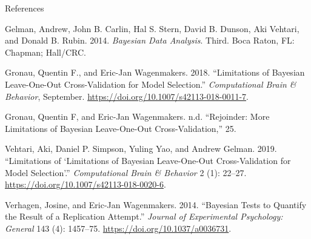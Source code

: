 \documentclass[12pt,ignorenonframetext,aspectratio=169]{beamer}
\begin{document}
\begin{frame}{References}
\protect\hypertarget{references}{}

\hypertarget{refs}{}
\leavevmode\hypertarget{ref-Gelman14}{}%
Gelman, Andrew, John B. Carlin, Hal S. Stern, David B. Dunson, Aki Vehtari, and Donald B. Rubin. 2014. \emph{Bayesian Data Analysis}. Third. Boca Raton, FL: Chapman; Hall/CRC.

\leavevmode\hypertarget{ref-gronauLimitationsBayesianLeaveOneOut2018}{}%
Gronau, Quentin F., and Eric-Jan Wagenmakers. 2018. ``Limitations of Bayesian Leave-One-Out Cross-Validation for Model Selection.'' \emph{Computational Brain \& Behavior}, September. \url{https://doi.org/10.1007/s42113-018-0011-7}.

\leavevmode\hypertarget{ref-gronauRejoinderMoreLimitations}{}%
Gronau, Quentin F, and Eric-Jan Wagenmakers. n.d. ``Rejoinder: More Limitations of Bayesian Leave-One-Out Cross-Validation,'' 25.

\leavevmode\hypertarget{ref-vehtariLimitationsLimitationsBayesian2019}{}%
Vehtari, Aki, Daniel P. Simpson, Yuling Yao, and Andrew Gelman. 2019. ``Limitations of `Limitations of Bayesian Leave-One-Out Cross-Validation for Model Selection'.'' \emph{Computational Brain \& Behavior} 2 (1): 22--27. \url{https://doi.org/10.1007/s42113-018-0020-6}.

\leavevmode\hypertarget{ref-verhagenBayesianTestsQuantify2014}{}%
Verhagen, Josine, and Eric-Jan Wagenmakers. 2014. ``Bayesian Tests to Quantify the Result of a Replication Attempt.'' \emph{Journal of Experimental Psychology: General} 143 (4): 1457--75. \url{https://doi.org/10.1037/a0036731}.

\end{frame}
\end{document}
